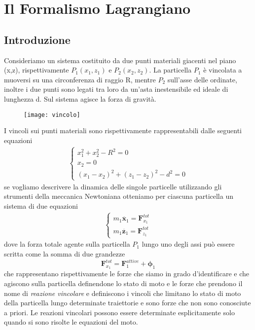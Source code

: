 \setcounter{chapter}{2}
\chapter{Il Formalismo Lagrangiano}

\section{Introduzione}

Consideriamo un sistema costituito da due punti materiali giacenti nel piano (x,z), rispettivamente $P_1(x_1,z_1)$ e $P_2(x_2,z_2)$. La particella $P_1$ \`{e} vincolata a muoversi su una circonferenza di raggio R, mentre $P_2$ sull'asse delle ordinate, inoltre i due punti sono legati tra loro da un'asta inestensibile ed ideale di lunghezza d. Sul sistema agisce la forza di gravit\`{a}.

 
\begin{figure}[ht]
\vspace{0.2in}
\texttt{[image: vincolo]}	
\centering
\end{figure}

\noindent I vincoli sui punti materiali sono rispettivamente rappresentabili dalle seguenti equazioni
\begin{align}
	\left \{ \begin{array}{l}
		x_{1}^2 + x_{2}^2 - R^2 = 0 \\
		x_2 = 0\\
		(x_1 - x_2)^2 + (z_1 - z_2)^2 - d^2 = 0
	\end{array} \right.
\end{align}
se vogliamo descrivere la dinamica delle singole particelle utilizzando gli strumenti della meccanica Newtoniana otteniamo per ciascuna particella un sistema di due equazioni 
\begin{align}
	\left \{ \begin{array}{l}
		m_1 \ddot{\bm{x}_1} = \bm{F}_{x_1}^{tot} \\
		m_1 \ddot{\bm{z}_1} = \bm{F}_{z_1}^{tot}
	\end{array} \right.
\end{align}
dove la forza totale agente sulla particella $P_{1}$ lungo uno degli assi pu\`{o} essere scritta come la somma di due grandezze
\begin{equation}
	\bm{F}_{x_1}^{tot} = \bm{F}^{attive}_1 + \bm{\phi}_1
\end{equation}
che rappresentano rispettivamente le forze che siamo in grado d'identificare e che agiscono sulla particella definendone lo stato di moto e le forze che prendono il nome di \textit{reazione vincolare} e definiscono i vincoli che limitano lo stato di moto della particella lungo determinate traiettorie e sono forze che non sono conosciute a priori. Le reazioni vincolari possono essere determinate esplicitamente solo quando si sono risolte le equazioni del moto.

